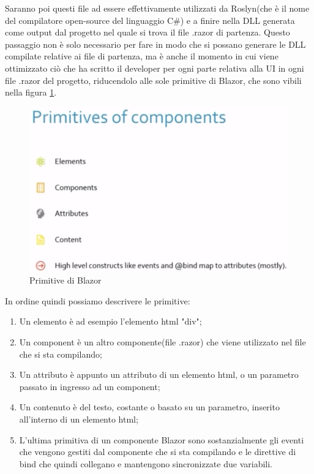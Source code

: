 Saranno poi questi file ad essere effettivamente utilizzati da Roslyn(che \`e il nome del compilatore open-source del linguaggio C\#) e a finire nella DLL generata come output dal progetto nel quale si trova il file .razor di partenza.
Questo passaggio non \`e solo necessario per fare in modo che si possano generare le DLL compilate relative ai file di partenza, ma \`e anche il momento in cui viene ottimizzato ci\`o che ha scritto il developer per ogni parte relativa alla UI in ogni file .razor del progetto, riducendolo alle sole primitive di Blazor, che sono vibili nella figura \ref{fig:BlazorPrimitives}.

\begin{figure}[H]
	\centerline{\includegraphics[scale=0.7]{figure/BlazorPrimitives.PNG}}
	\caption{Primitive di Blazor\cite{ryanNowakNDCSydney}}
	\label{fig:BlazorPrimitives}
\end{figure}

In ordine quindi possiamo descrivere le primitive:
\begin{enumerate}
	\item Un elemento \`e ad esempio l'elemento html "div";
	\item Un component \`e un altro componente(file .razor) che viene utilizzato nel file che si sta compilando;
	\item Un attributo \`e appunto un attributo di un elemento html, o un parametro passato in ingresso ad un component;
	\item Un contenuto \`e del testo, costante o basato su un parametro, inserito all'interno di un elemento html;
	\item L'ultima primitiva di un componente Blazor sono sostanzialmente gli eventi che vengono gestiti dal componente che si sta compilando e le direttive di bind che quindi collegano e mantengono sincronizzate due variabili.
\end{enumerate}

\pagebreak